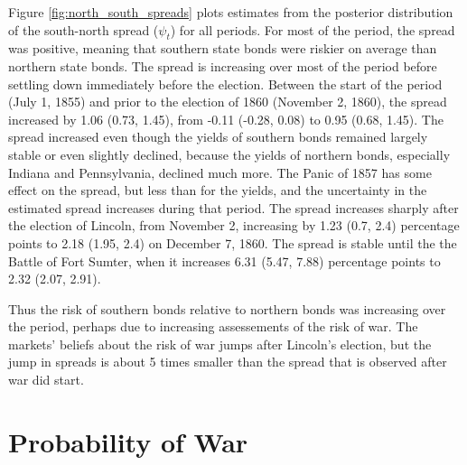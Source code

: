 \documentclass[11pt, oneside, article]{memoir}\usepackage[]{graphicx}\usepackage[]{color}
\begin{document}
Figure \ref{fig:north_south_spreads} plots estimates from the posterior distribution of the south-north spread ($\psi_{t}$) for all periods.
For most of the period, the spread was positive, meaning that southern state bonds were riskier on average than northern state bonds.
The spread is increasing over most of the period before settling down immediately before the election.
Between the start of the period (July 1, 1855) and prior to the election of 1860 (November 2, 1860), the spread increased by 1.06 (0.73, 1.45),
from -0.11 (-0.28, 0.08) to 0.95 (0.68, 1.45).
The spread increased even though the yields of southern bonds remained largely stable or even slightly declined, because the yields of northern bonds, especially Indiana and Pennsylvania, declined much more.
The Panic of 1857 has some effect on the spread, but less than for the yields, and the uncertainty in the estimated spread increases during that period.
The spread increases sharply after the election of Lincoln, from November 2, increasing by 1.23 (0.7, 2.4) percentage points to 2.18 (1.95, 2.4) on December 7, 1860.
The spread is stable until the the Battle of Fort Sumter, when it increases 6.31 (5.47, 7.88) percentage points to 2.32 (2.07, 2.91).

Thus the risk of southern bonds relative to northern bonds was increasing over the period, perhaps due to increasing assessements of the risk of war.
The markets' beliefs about the risk of war jumps after Lincoln's election, but the jump in spreads is about 5 times smaller than the spread that is observed after war did start.

\section{Probability of War}
\label{sec:probability-war}
\end{document}
